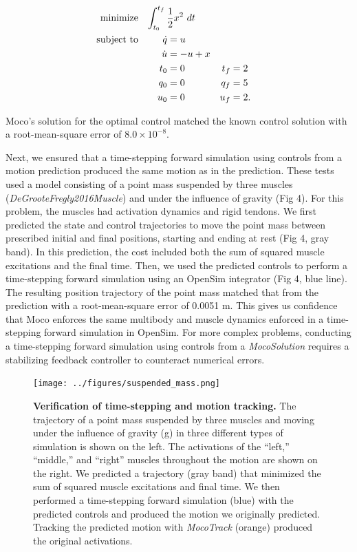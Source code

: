 \documentclass[10pt,letterpaper]{article}
\newcommand{\analytic}{
\begin{equation}
    \begin{aligned}
        \mbox{minimize} \quad
         \mathrlap{\int_{t_0}^{t_f} \frac{1}{2}x^2~dt}  \\
         \mbox{subject to} \quad
         && \dot{q} &= u \\
         && \dot{u} &= -u + x \\
         && t_0 &= 0 & t_f &= 2 \\
         && q_0 &= 0 & q_f &= 5 \\
         && u_0 &= 0 & u_f &= 2.
    \end{aligned}
\end{equation}
}
\begin{document}
\analytic

Moco’s solution for the optimal control matched the known control solution with a root-mean-square error of $8.0 \times 10^{-8}$.

Next, we ensured that a time-stepping forward simulation using controls from a motion prediction produced the same motion as in the prediction. These tests used a model consisting of a point mass suspended by three muscles (\textit{DeGrooteFregly2016Muscle}) and under the influence of gravity (Fig 4). For this problem, the muscles had activation dynamics and rigid tendons. We first predicted the state and control trajectories to move the point mass between prescribed initial and final positions, starting and ending at rest (Fig 4, gray band). In this prediction, the cost included both the sum of squared muscle excitations and the final time. Then, we used the predicted controls to perform a time-stepping forward simulation using an OpenSim integrator (Fig 4, blue line). The resulting position trajectory of the point mass matched that from the prediction with a root-mean-square error of 0.0051 m. This gives us confidence that Moco enforces the same multibody and muscle dynamics enforced in a time-stepping forward simulation in OpenSim. For more complex problems, conducting a time-stepping forward simulation using controls from a \textit{MocoSolution} requires a stabilizing feedback controller to counteract numerical errors.

\begin{figure}[!h]
        \centering
        \texttt{[image: ../figures/suspended\_mass.png]}
        \caption{{\bf Verification of time-stepping and motion tracking.}
       The trajectory of a point mass suspended by three muscles and moving under the influence of gravity (g) in three different types of simulation is shown on the left. The activations of the “left,” “middle,” and “right” muscles throughout the motion are shown on the right. We predicted a trajectory (gray band) that minimized the sum of squared muscle excitations and final time. We then performed a time-stepping forward simulation (blue) with the predicted controls and produced the motion we originally predicted. Tracking the predicted motion with \textit{MocoTrack} (orange) produced the original activations.
        }
        \label{verification}
\end{figure}
\end{document}
